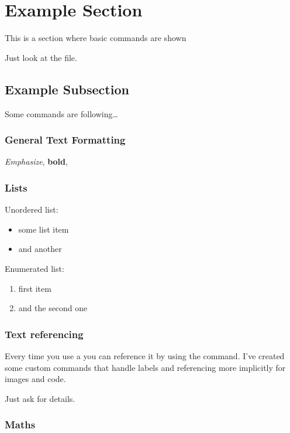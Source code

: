 

\section{Example Section}

This is a section where basic commands are shown

Just look at the  file.

\subsection{Example Subsection}

Some commands are following\ldots

\subsubsection{General Text Formatting}

\emph{Emphasize}, \textbf{bold}, 

\subsubsection{Lists}

Unordered list:
\begin{itemize}
    \item some list item
    \item and another
\end{itemize}

Enumerated list:
\begin{enumerate}
    \item first item
    \item and the second one
\end{enumerate}

\subsubsection{Text referencing}

Every time you use a  you can reference it by using the  command.
I've created some custom commands that handle labels and referencing more implicitly for images and code.

Just ask for details.

\subsubsection{Maths}

